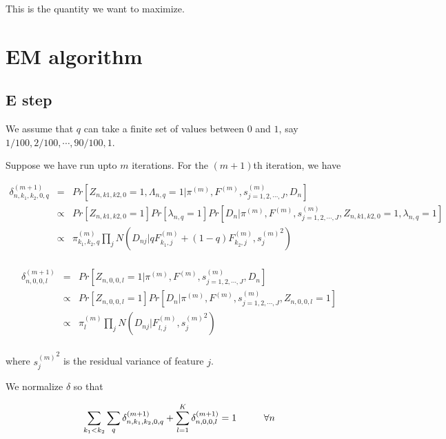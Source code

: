 \documentclass[11pt,authoryear]{article}
\begin{document}
This is the quantity we want to maximize. 

\section{EM algorithm}
\subsection{E step}

We assume that $q$ can take a finite set of values between $0$ and $1$, 
say $1/100, 2/100, \cdots, 90/100, 1$.

Suppose we have run upto $m$ iterations. For the $(m+1)$th iteration, we have 

\begin{eqnarray} \nonumber
\delta^{(m+1)}_{n, k_1, k_2, 0, q} &=& Pr \left [ Z_{n, k1, k2, 0} = 1, \Lambda_{n,q} = 1 | \pi^{(m)}, F^{(m)}, s^{(m)}_{j=1,2,\cdots,J}, D_{n} \right ] \\ \nonumber
 &\propto& Pr \left [ Z_{n, k1, k2,0} = 1 \right] Pr \left [ \lambda_{n,q} = 1 \right] Pr \left [ D_{n} | \pi^{(m)}, F^{(m)}, s^{(m)}_{j=1,2,\cdots,J}, Z_{n, k1, k2, 0}= 1, \lambda_{n, q}=1 \right] \\ \nonumber
 &\propto& \pi^{(m)}_{k_1,k_2, q} \prod_{j} N \left (D_{nj} | qF^{(m)}_{k_1,j} + (1-q)F^{(m)}_{k_2,j}, {s_j^{(m)}}^2 \right) \\ \nonumber
\end{eqnarray}

\begin{eqnarray} \nonumber
\delta^{(m+1)}_{n, 0, 0, l}  &=& Pr \left [ Z_{n, 0, 0, l} = 1  |  \pi^{(m)}, F^{(m)}, s^{(m)}_{j=1,2,\cdots,J}, D_{n} \right ] \\ \nonumber 
& \propto & Pr \left [ Z_{n, 0, 0, l} = 1 \right] Pr \left [ D_{n} | \pi^{(m)}, F^{(m)}, s^{(m)}_{j=1,2,\cdots,J}, Z_{n, 0, 0, l}= 1 \right] \\ \nonumber 
& \propto & \pi^{(m)}_{l}  \prod_{j} N \left (D_{nj} | F^{(m)}_{l,j} , {s_j^{(m)}}^2 \right) \\  \nonumber
\end{eqnarray}


where ${s_j^{(m)}}^2$ is the residual variance of feature $j$.

We normalize $\delta$ so that 

$$ \sum_{k_1 < k_2} \sum_{q} \delta^{(m+1)}_{n, k_1, k_2, 0, q}  + \sum_{l=1}^{K} \delta^{(m+1)}_{n, 0, 0, l}= 1 \hspace{1 cm} \forall n $$
\end{document}
